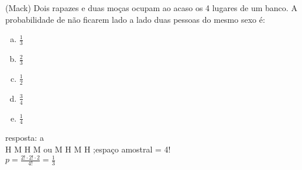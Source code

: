 \begin{ex}
 (Mack) Dois rapazes e duas moças ocupam ao acaso os 4 lugares de um banco. A probabilidade de não ficarem lado a lado duas pessoas do mesmo sexo é:
    \begin{enumerate}[(a)]
    \item $\frac{1}{3}$
    \item $\frac{2}{3}$
    \item $\frac{1}{2}$
    \item $\frac{3}{4}$
    \item $\frac{1}{4}$
    \end{enumerate}
      \begin{sol}
       resposta: a \\
       H M H M ou M H M H ;\hspace{0,2cm}espaço amostral = 4!\\
       $p=\frac{2!\cdot2!\cdot2}{4!}=\frac{1}{3}$
       \end{sol}
\end{ex}